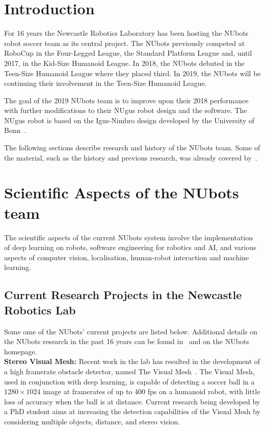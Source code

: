 \documentclass{llncs}
\begin{document}
%
\section{Introduction}
For 16 years the Newcastle Robotics Laboratory has been hosting the NUbots robot soccer team as its central project. The NUbots previously competed at RoboCup in the Four-Legged League, the Standard Platform League and, until 2017, in the Kid-Size Humanoid League. In 2018, the NUbots debuted in the Teen-Size Humanoid League where they placed third. In 2019, the NUbots will be continuing their involvement in the Teen-Size Humanoid League.

The goal of the 2019 NUbots team is to improve upon their 2018 performance with further modifications to their NUgus robot design and the software. The NUgus robot is based on the Igus-Nimbro design developed by the University of Bonn~\cite{allgeuer2016igus}. 

The following sections describe research and history of the NUbots team. Some of the material, such as the history and previous research, was already covered by~\cite{AmosEtAl2018}.


\section{Scientific Aspects of the NUbots team}
 
The scientific aspects of the current NUbots system involve the implementation of deep learning on robots, software engineering for robotics and AI, and various aspects of computer vision, localisation, human-robot interaction and machine learning.

\subsection{Current Research Projects in the Newcastle Robotics Lab}
Some ome of the NUbots' current projects are listed below. Additional details on the NUbots research in the past 16 years can be found in~\cite{AmosEtAl2018} and on the NUbots homepage.\\

\noindent\textbf{Stereo Visual Mesh:} 
Recent work in the lab has resulted in the development of a high framerate obstacle detector, named The Visual Mesh~\cite{Houliston2018VisualMR}. The Visual Mesh, used in conjunction with deep learning, is capable of detecting a soccer ball in a $1280\times 1024$ image at framerates of up to $400$ fps on a humanoid robot, with little loss of accuracy when the ball is at distance. Current research being developed by a PhD student aims at increasing the detection capabilities of the Visual Mesh by considering multiple objects, distance, and stereo vision.\\
\end{document}
